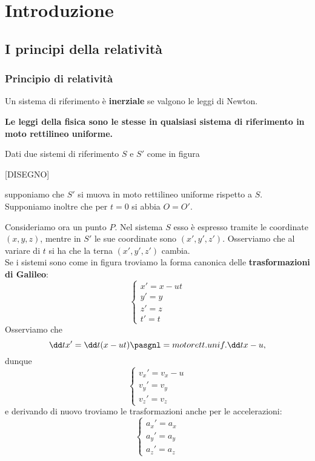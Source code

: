 \chapter{Introduzione}
\section{I principi della relativit\`a}

\subsection{Principio di relativit\`a}

\begin{definition}
Un sistema di riferimento \`e \textbf{inerziale} se valgono le leggi di Newton.
\end{definition}

\begin{fact}
\textbf{Le leggi della fisica sono le stesse in qualsiasi sistema di riferimento in moto rettilineo uniforme.}
\end{fact}

Dati due sistemi di riferimento $S$ e $S'$ come in figura

[DISEGNO]

supponiamo che $S'$ si muova in moto rettilineo uniforme rispetto a $S$. Supponiamo inoltre che per $t=0$ si abbia $O=O'$.
\medskip

\noindent
Consideriamo ora un punto $P$. Nel sistema $S$ esso \`e espresso tramite le coordinate $(x,y,z)$, mentre in $S'$ le sue coordinate sono $(x',y',z')$. Osserviamo che al variare di $t$ si ha che la terna $(x',y',z')$ cambia.\\
Se i sistemi sono come in figura troviamo la forma canonica delle \textbf{trasformazioni di Galileo}:
\[\begin{cases}
x'=x-ut\\
y'=y\\
z'=z\\
t'=t
\end{cases}\]
Osserviamo che
\[\dd t{x'}=\dd t{}(x-ut)\pasgnl={moto rett. unif.}\dd tx-u,\]
dunque
\[\begin{cases}
v_x'=v_x-u\\
v_y'=v_y\\
v_z'=v_z
\end{cases}\]
e derivando di nuovo troviamo le trasformazioni anche per le accelerazioni:
\[\begin{cases}
a_x'=a_x\\
a_y'=a_y\\
a_z'=a_z
\end{cases}\]

